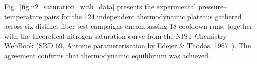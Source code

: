\documentclass[preprint,11pt]{elsarticle}
\begin{document}
Fig.~\ref{fig:n2_saturation_with_data} presents the experimental pressure--temperature pairs for the 124 independent thermodynamic plateaus gathered across six distinct fiber test campaigns encompassing 18 cooldown runs, together with the theoretical nitrogen saturation curve from the NIST Chemistry WebBook (SRD 69, Antoine parameterisation by Edejer \& Thodos, 1967~\cite{Edejer1967}). The agreement confirms that thermodynamic equilibrium was achieved. 



\end{document}
